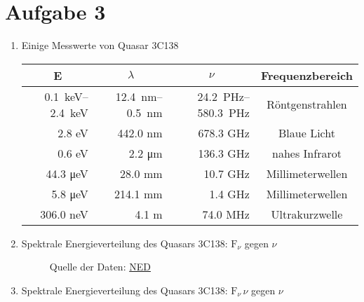\documentclass[11pt,a4paper]{scrartcl}
\newcommand{\head}[1]{\multicolumn{1}{c}{#1}}
\begin{document}
\section*{Aufgabe 3}

\begin{enumerate}[label=\textbf{\large(\alph*)}]

\item
Einige Messwerte von Quasar 3C138

\begin{table}[h!]
\centering
\begin{tabular}{rrrc}
    \toprule
    \head{E} & \head{$\lambda$} & \head{$\nu$} & \head{Frequenzbereich} \\
    \midrule
    \SIrange{0.1}{2.4}{\kilo\electronvolt} & \SIrange{12.4}{0.5}{\nano\metre} &
    \SIrange{24.2}{580.3}{\peta\hertz} & Röntgenstrahlen \\
    2.8 \si{\electronvolt} & 442.0 \si{\nano\metre} & 678.3 \si{\giga\hertz} &
    Blaue Licht \\
    0.6 \si{\electronvolt} & 2.2 \si{\micro\metre} & 136.3 \si{\giga\hertz} &
    nahes Infrarot \\
    44.3 \si{\micro\electronvolt} & 28.0 \si{\milli\metre} & 10.7 \si{\giga\hertz}
    &  Millimeterwellen \\
    5.8 \si{\micro\electronvolt} & 214.1 \si{\milli\metre} & 1.4 \si{\giga\hertz}
    & Millimeterwellen \\
    306.0 \si{\nano\electronvolt} & 4.1 \si{\metre} & 74.0 \si{\mega\hertz} &
    Ultrakurzwelle \\
    \bottomrule
\end{tabular}
\label{tab:tab1}
\end{table}
\vspace*{\baselineskip}


\item
Spektrale Energieverteilung des Quasars 3C138: $\mathrm{F}_{\nu}$ gegen
$\nu$

\begin{figure}[h!]
    \centering
    
    \caption{Quelle der Daten: \href{https://ned.ipac.caltech.edu/}{NED}}
\end{figure}
\vspace*{\baselineskip}
\newpage

\item
Spektrale Energieverteilung des Quasars 3C138: $\mathrm{F}_{\nu}\,\nu$
gegen $\nu$

\begin{figure}[h!]
    \centering
    
\end{figure}


\end{enumerate}
\end{document}

